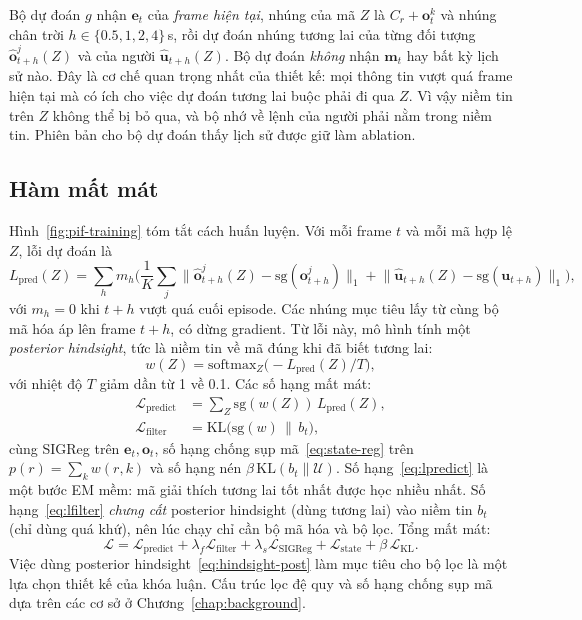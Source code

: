 Bộ dự đoán $g$ nhận $\mathbf{e}_t$ của \emph{frame hiện tại}, nhúng của mã $Z$ là $C_r+\mathbf{o}^k_t$ và nhúng chân trời $h\in\{0.5,1,2,4\}$\,s, rồi dự đoán nhúng tương lai của từng đối tượng $\hat{\mathbf{o}}^j_{t+h}(Z)$ và của người $\hat{\mathbf{u}}_{t+h}(Z)$. Bộ dự đoán \emph{không} nhận $\mathbf{m}_t$ hay bất kỳ lịch sử nào. Đây là cơ chế quan trọng nhất của thiết kế: mọi thông tin vượt quá frame hiện tại mà có ích cho việc dự đoán tương lai buộc phải đi qua $Z$. Vì vậy niềm tin trên $Z$ không thể bị bỏ qua, và bộ nhớ về lệnh của người phải nằm trong niềm tin. Phiên bản cho bộ dự đoán thấy lịch sử được giữ làm ablation.

\subsection{Hàm mất mát}

Hình~\ref{fig:pif-training} tóm tắt cách huấn luyện. Với mỗi frame $t$ và mỗi mã hợp lệ $Z$, lỗi dự đoán là
\begin{equation}
  L_{\text{pred}}(Z)=\sum_{h} m_h\Big(\frac{1}{K}\sum_j\big\|\hat{\mathbf{o}}^j_{t+h}(Z)-\mathrm{sg}(\mathbf{o}^j_{t+h})\big\|_1+\big\|\hat{\mathbf{u}}_{t+h}(Z)-\mathrm{sg}(\mathbf{u}_{t+h})\big\|_1\Big),
  \label{eq:lpred}
\end{equation}
với $m_h=0$ khi $t+h$ vượt quá cuối episode. Các nhúng mục tiêu lấy từ cùng bộ mã hóa áp lên frame $t+h$, có dừng gradient. Từ lỗi này, mô hình tính một \emph{posterior hindsight}, tức là niềm tin về mã đúng khi đã biết tương lai:
\begin{equation}
  w(Z)=\mathrm{softmax}_Z\big(-L_{\text{pred}}(Z)/T\big),
  \label{eq:hindsight-post}
\end{equation}
với nhiệt độ $T$ giảm dần từ 1 về 0.1. Các số hạng mất mát:
\begin{align}
  \mathcal{L}_{\text{predict}} &= \textstyle\sum_Z \mathrm{sg}(w(Z))\,L_{\text{pred}}(Z), \label{eq:lpredict}\\
  \mathcal{L}_{\text{filter}} &= \mathrm{KL}\big(\mathrm{sg}(w)\,\big\|\,b_t\big), \label{eq:lfilter}
\end{align}
cùng SIGReg trên $\mathbf{e}_t,\mathbf{o}_t$, số hạng chống sụp mã~\eqref{eq:state-reg} trên $p(r)=\sum_k w(r,k)$ và số hạng nén $\beta\,\mathrm{KL}(b_t\|\mathcal{U})$. Số hạng~\eqref{eq:lpredict} là một bước EM mềm: mã giải thích tương lai tốt nhất được học nhiều nhất. Số hạng~\eqref{eq:lfilter} \emph{chưng cất} posterior hindsight (dùng tương lai) vào niềm tin $b_t$ (chỉ dùng quá khứ), nên lúc chạy chỉ cần bộ mã hóa và bộ lọc. Tổng mất mát:
\begin{equation}
  \mathcal{L}=\mathcal{L}_{\text{predict}}+\lambda_f\mathcal{L}_{\text{filter}}+\lambda_s\mathcal{L}_{\text{SIGReg}}+\mathcal{L}_{\text{state}}+\beta\,\mathcal{L}_{\text{KL}}.
  \label{eq:ltotal}
\end{equation}
Việc dùng posterior hindsight~\eqref{eq:hindsight-post} làm mục tiêu cho bộ lọc là một lựa chọn thiết kế của khóa luận. Cấu trúc lọc đệ quy và số hạng chống sụp mã dựa trên các cơ sở ở Chương~\ref{chap:background}.

